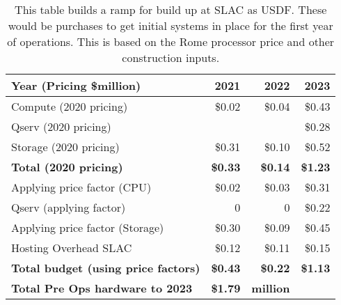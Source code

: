\tiny \begin{longtable} {|l |r  |r  |r |} \caption{This table builds a ramp for build up at SLAC as USDF. These would be purchases to get initial systems in place for the first year of operations. This is based on the Rome processor price and other construction inputs. \label{tab:preOps}}\\ 
\hline 
\textbf{Year (Pricing \$million)}&\textbf{2021}&\textbf{2022}&\textbf{2023} \\ \hline
{Compute (2020 pricing)}&{\$0.02}&{\$0.04}&{\$0.43} \\ \hline
{Qserv (2020 pricing)}&{}&{}&{\$0.28} \\ \hline
{Storage (2020 pricing)}&{\$0.31}&{\$0.10}&{\$0.52} \\ \hline
\textbf{Total (2020 pricing)}&\textbf{\$0.33}&\textbf{\$0.14}&\textbf{\$1.23} \\ \hline
{Applying price factor (CPU)}&{\$0.02}&{\$0.03}&{\$0.31} \\ \hline
{Qserv (applying factor)}&{0}&{0}&{\$0.22} \\ \hline
{Applying price factor (Storage)}&{\$0.30}&{\$0.09}&{\$0.45} \\ \hline
{Hosting Overhead SLAC}&{\$0.12}&{\$0.11}&{\$0.15} \\ \hline
\textbf{Total budget (using price factors)}&\textbf{\$0.43}&\textbf{\$0.22}&\textbf{\$1.13} \\ \hline
\textbf{Total Pre Ops hardware to 2023}&\textbf{\$1.79}&\textbf{million}& \\ \hline
\end{longtable} \normalsize
